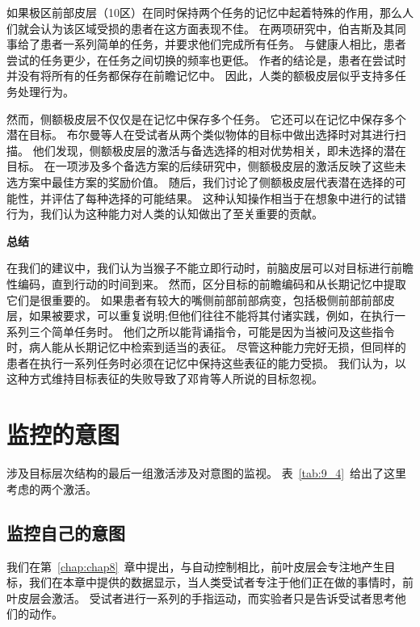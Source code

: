 如果极区前部皮层（10区）在同时保持两个任务的记忆中起着特殊的作用，那么人们就会认为该区域受损的患者在这方面表现不佳。
在两项研究中，伯吉斯及其同事给了患者一系列简单的任务，并要求他们完成所有任务\cite{burgess2000cognitive,burgess2007function}。
与健康人相比，患者尝试的任务更少，在任务之间切换的频率也更低。
作者的结论是，患者在尝试时并没有将所有的任务都保存在前瞻记忆中。
因此，人类的额极皮层似乎支持多任务处理行为。
\par


然而，侧额极皮层不仅仅是在记忆中保存多个任务。
它还可以在记忆中保存多个潜在目标。
布尔曼等人\cite{boorman2009green}在受试者从两个类似物体的目标中做出选择时对其进行扫描。
他们发现，侧额极皮层的激活与备选选择的相对优势相关，即未选择的潜在目标。
在一项涉及多个备选方案的后续研究中，侧额极皮层的激活反映了这些未选方案中最佳方案的奖励价值\cite{boorman2011counterfactual}。
随后，我们讨论了侧额极皮层代表潜在选择的可能性，并评估了每种选择的可能结果。
这种认知操作相当于在想象中进行的试错行为，我们认为这种能力对人类的认知做出了至关重要的贡献。
\par



\textbf{总结}
\par
在我们的建议中，我们认为当猴子不能立即行动时，前脑皮层可以对目标进行前瞻性编码，直到行动的时间到来。
然而，区分目标的前瞻编码和从长期记忆中提取它们是很重要的。
如果患者有较大的嘴侧前部前部病变，包括极侧前部前部皮层，如果被要求，可以重复说明;但他们往往不能将其付诸实践，例如，在执行一系列三个简单任务时\cite{burgess2000cognitive}。
他们之所以能背诵指令，可能是因为当被问及这些指令时，病人能从长期记忆中检索到适当的表征。
尽管这种能力完好无损，但同样的患者在执行一系列任务时必须在记忆中保持这些表征的能力受损。
我们认为，以这种方式维持目标表征的失败导致了邓肯等人\cite{duncan2008goal}所说的目标忽视。



\section{监控的意图}
\par
涉及目标层次结构的最后一组激活涉及对意图的监视。
表~\ref{tab:9_4}~给出了这里考虑的两个激活。
\par


\subsection{监控自己的意图}
\par
我们在第~\ref{chap:chap8}~章中提出，与自动控制相比，前叶皮层会专注地产生目标，我们在本章中提供的数据显示，当人类受试者专注于他们正在做的事情时，前叶皮层会激活\cite{rowe2002attention}。
受试者进行一系列的手指运动，而实验者只是告诉受试者思考他们的动作。
\par


